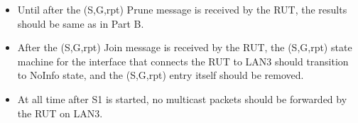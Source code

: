 \documentclass[11pt]{report}
\begin{document}

\begin{itemize}

  \item Until after the (S,G,rpt) Prune message is received by the RUT, the
  results should be same as in Part B.

  \item After the (S,G,rpt) Join message is received by the RUT,
  the (S,G,rpt) state machine for the interface that connects the RUT to
  LAN3 should transition to NoInfo state, and the (S,G,rpt) entry itself
  should be removed.

  \item At all time after S1 is started, no multicast packets should be
  forwarded by the RUT on LAN3.

\end{itemize}

\end{document}
